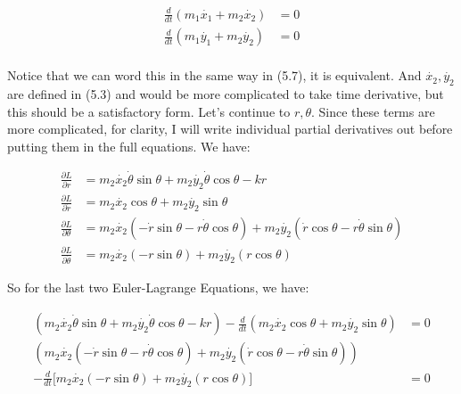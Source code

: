 \documentclass{article}
\numberwithin{equation}{section}
\begin{document}
\begin{equation}
\begin{split}
     \frac{d}{dt} (m_1 \dot{x_1} + m_2 \dot{x_2}) &= 0 \\
     \frac{d}{dt} (m_1 \dot{y_1} + m_2 \dot{y_2}) &= 0 \\
\end{split}
\end{equation}

Notice that we can word this in the same way in (5.7), it is equivalent. And $\dot{x_2}, \dot{y_2}$ are defined in (5.3) and would be more complicated to take time derivative, but this should be a satisfactory form. Let's continue to $r, \theta$. Since these terms are more complicated, for clarity, I will write individual partial derivatives out before putting them in the full equations. We have:

\begin{equation}
    \begin{split}
        \frac{\partial L}{\partial r} &= m_2 \dot{x_2} \dot{\theta} \sin \theta + m_2 \dot{y_2} \dot{\theta} \cos \theta - kr \\
        \frac{\partial L}{\partial \dot{r}} &= m_2 \dot{x_2} \cos \theta + m_2 \dot{y_2} \sin \theta \\
        \frac{\partial L}{\partial \theta} &=  m_2 \dot{x_2}( - \dot{r} \sin \theta - r \dot{\theta} \cos \theta) + m_2 \dot{y_2}( \dot{r} \cos\theta - r \dot{\theta} \sin \theta) \\
        \frac{\partial L}{\partial \dot{\theta}} &= m_2 \dot{x_2} (- r \sin \theta) + m_2 \dot{y_2} (r \cos \theta)
    \end{split}
\end{equation}

So for the last two Euler-Lagrange Equations, we have:

\begin{equation}
\begin{split}
    (m_2 \dot{x_2} \dot{\theta} \sin \theta + m_2 \dot{y_2} \dot{\theta} \cos \theta - kr) - \frac{d}{dt}(m_2 \dot{x_2} \cos \theta + m_2 \dot{y_2} \sin \theta) &= 0 \\
    (m_2 \dot{x_2}( - \dot{r} \sin \theta - r \dot{\theta} \cos \theta) + m_2 \dot{y_2}( \dot{r} \cos\theta - r \dot{\theta} \sin \theta))&\\ - \frac{d}{dt} \lbrack m_2 \dot{x_2} (- r \sin \theta) + m_2 \dot{y_2} (r \cos \theta) \rbrack &= 0
\end{split}
\end{equation}
\end{document}
